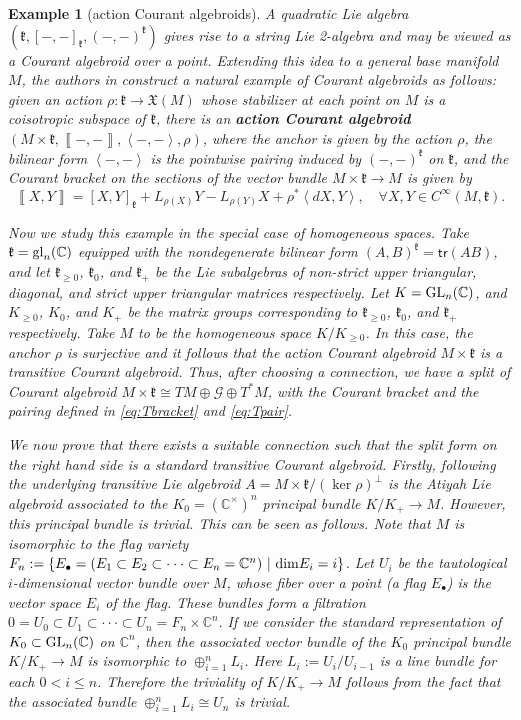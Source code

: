 \documentclass[letterpaper,10pt, oneside]{article} %
\newtheorem{ep}[thm]{Example}
\newcommand{\tr}{\mathsf{tr}}
\newcommand{\frkk}{\mathfrak k}
\newcommand{\frkX}{\mathfrak X}
\newcommand{\pair}[1]{\left\langle #1\right\rangle}
\newcommand{\Courant}[1]{\left\llbracket  #1\right\rrbracket }
\begin{document}
\begin{ep}[action Courant algebroids]{\rm\label{ep:action-courant}
A quadratic Lie algebra $(\frkk, [-,-]_\frkk,(-, -)^\frkk)$ gives rise to a string Lie 2-algebra \cite[Sect. 2]{sheng-zhu} and may be viewed as a Courant algebroid over a point. Extending this idea to a general base manifold $M$, the authors in \cite{LBM} construct a natural example of Courant algebroids as follows: given an action $\rho: \frkk \to \frkX(M)$ whose stabilizer at each point on $M$ is a coisotropic subspace of $\frkk$,  there is an {\bf action Courant algebroid} $(M\times\frkk,\Courant{-,-},\pair{-, -},\rho)$, where the anchor is given by the action $\rho$, the bilinear form $\pair{-, -}$ is the pointwise pairing induced by $(-, -)^\frkk$ on  $\frkk$, and the Courant bracket on the sections of the vector bundle $M\times \frkk \to M$ is given by
\[ \Courant{X, Y}=[X, Y]_\frkk+L_{\rho(X)}Y-L_{\rho(Y)}X+ \rho^*\pair{dX, Y}, \quad \forall X, Y \in C^\infty(M, \frkk).\]

Now we study this example in the special case of homogeneous spaces.  Take $\frkk={\rm gl}_n(\mathbb{C})$ equipped with the nondegenerate bilinear form $(A, B)^\frkk=\tr(AB)$, and let $\frkk_{\ge 0}$, $\frkk_0$, and $\frkk_+$ be the Lie subalgebras of non-strict upper triangular, diagonal, and strict upper triangular matrices respectively.  Let $K={\rm GL}_n(\mathbb{C})$, and  $K_{\ge 0}$, $K_0$, and $K_+$ be the matrix groups corresponding to $\frkk_{\ge 0}$, $\frkk_0$, and $\frkk_+$ respectively. Take $M$ to be the homogeneous space $K/K_{\ge 0}$. In this case, the anchor $\rho$ is surjective and it follows that the action Courant algebroid $M\times \frkk$ is a transitive Courant algebroid. Thus, after choosing a connection, we have a split of Courant algebroid $M\times \frkk \cong TM\oplus \mathcal{G} \oplus T^*M$, with the Courant bracket and the pairing defined in \eqref{eq:Tbracket} and \eqref{eq:Tpair}.

We now prove that there exists a suitable connection such that the split form on the right hand side is a standard transitive Courant algebroid. Firstly, following \cite[Proposition 3.9]{Xu} the underlying transitive Lie algebroid $A=M\times \frkk / (\ker\rho)^\perp$ is the Atiyah Lie algebroid associated to the $K_0=(\mathbb{C^\times})^n$ principal bundle $K/K_+\to M$. However, this principal bundle is trivial. This can be seen as follows. Note that $M$ is isomorphic to the flag variety $F_n := \{E_\bullet=(E_1\subset E_2\subset\cdot\cdot\cdot\subset E_n = \mathbb{C}^n)~|~ {\rm dim} E_i= i\}$. Let $U_i$ be the tautological $i$-dimensional vector bundle over $M$, whose fiber over a point (a flag $E_\bullet$) is the vector space $E_i$ of the flag. These bundles form a filtration
$0 = U_0 \subset U_1\subset \cdot\cdot\cdot \subset U_n=F_n\times \mathbb{C}^n.$ If we consider the standard representation of $K_0\subset {\rm GL}_n(\mathbb{C})$ on $\mathbb{C}^n$, then the associated vector bundle of the $K_0$ principal bundle $K/K_+\to M$ is isomorphic to $\oplus_{i=1}^n L_i$. Here $L_i:=U_i/U_{i-1}$ is a line bundle for each $0<i\le n$. Therefore the triviality of $K/K_+\to M$ follows from the fact that the associated bundle $\displaystyle{\oplus_{i=1}^n} L_i\cong U_n$ is trivial.

}
\end{ep}
\end{document}
